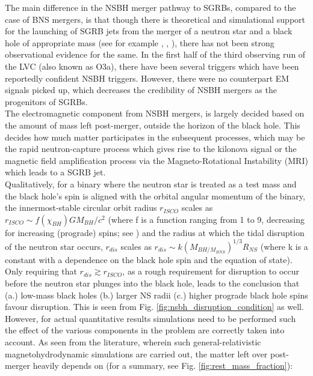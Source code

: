     The main difference in the NSBH merger pathway to SGRBs, compared to the case of BNS
    mergers, is that though there is theoretical and simulational support for the
    launching of SGRB jets from the merger of a neutron star and a black hole of
    appropriate mass (see for example \cite{ruiz_2020}, \cite{shibata_2019},
    \cite{foucart_2020}), there has not been strong observational evidence for the same.
    In the first half of the third observing run of the LVC (also known as O3a), there
    have been several triggers which have been reportedly confident NSBH triggers.
    However, there were no counterpart EM signals picked up, which decreases the
    credibility of NSBH mergers as the progenitors of SGRBs.\\
    The electromagnetic component from NSBH mergers, is largely decided based on the
    amount of mass left post-merger, outside the horizon of the black hole. This decides
    how much matter participates in the subsequent processes, which may be the rapid
    neutron-capture process which gives rise to the kilonova signal or the magnetic
    field amplification process via the Magneto-Rotational Instability (MRI) which leads
    to a SGRB jet.\\
    Qualitatively, for a binary where the neutron star is treated as a test mass and the
    black hole's spin is aligned with the orbital angular momentum of the binary, the
    innermost-stable circular orbit radius $r_{ISCO}$ scales as $r_{ISCO} \sim
    f(\chi_{BH}) G M_{BH}/c^2$ (where f is a function ranging from 1 to 9, decreasing
    for increasing (prograde) spins; see \cite{bardeen_1972}) and the radius at which
    the tidal disruption of the neutron star occurs, $r_{dis}$ scales as $r_{dis} \sim k
    (M_{BH/M_{BNS}})^{1/3} R_{NS}$ (where k is a constant with a dependence on the black
    hole spin and the equation of state). Only requiring that $r_{dis} \gtrsim
    r_{ISCO}$, as a rough requirement for disruption to occur before the neutron star
    plunges into the black hole, leads to the conclusion that (a.) low-mass black holes
    (b.) larger NS radii (c.) higher prograde black hole spins favour disruption. This
    is seen from Fig. \ref{fig:nsbh_disruption_condition} as well. However, for actual
    quantitative results simulations need to be performed such the effect of the various
    components in the problem are correctly taken into account. As seen from the
    literature, wherein such general-relativistic magnetohydrodynamic simulations are
    carried out, the matter left over post-merger heavily depends on (for a summary, see
    Fig.  \ref{fig:rest_mass_fraction}):

